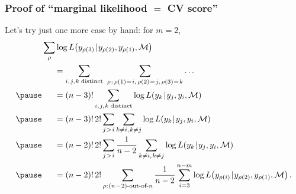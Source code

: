 \documentclass[18pt]{beamer}
\newcommand{\defineTightSpacing}{%
	\setlength{\abovedisplayskip}{.25\baselineskip}%
	\setlength{\belowdisplayskip}{.25\baselineskip}%
}
\newcommand{\given}{\thinnerspace | \thinnerspace}
\newcommand{\spacedColon}{\mkern .5mu : \mkern 1mu}
\newcommand{\spacedEq}{\mkern 1mu = \mkern 1.5mu}
\newcommand{\thinnerspace}{\mskip.5\thinmuskip}
\newcommand{\likelihood}{L}
\newcommand{\modelSymbol}{\mathcal{M}}
\newcommand{\permutation}{\rho}
\newcommand{\trainingSize}{m}
\newcommand{\testSampleIndex}{i}
\begin{document}
\begin{frame}
\frametitle{Proof of ``marginal likelihood $=$ {\large CV} score''}
Let's try just one more case by hand: for $\trainingSize = 2$,  
\begin{equation*} %
\begin{aligned}
&\sum_\permutation \log \likelihood\!\left(y_{\permutation(3)} \given y_{\permutation(2)}, y_{\permutation(1)}, \modelSymbol \right) \\
	&\hspace*{1.5em}= \sum_{\testSampleIndex, \thinnerspace j, \thinnerspace k \mkern 5mu \mathrm{distinct}} \ 
	\sum_{\permutation \thinnerspace : \, \permutation(1) \spacedEq i, \, \permutation(2) \spacedEq j, \, \permutation(3) \spacedEq k} \ldots \\
	\pause
	&\hspace*{1.5em}= (n - 3)! \sum_{\testSampleIndex, \thinnerspace j, \thinnerspace k \mkern 5mu \mathrm{distinct}} \log \likelihood\!\left(y_k \given y_j, y_\testSampleIndex, \modelSymbol \right) \\
	\pause
	&\hspace*{1.5em}= (n - 3)! \, 2! \sum_{j \thinnerspace > \thinnerspace \testSampleIndex} \sum_{k \neq \testSampleIndex, \thinnerspace k \neq j} \log \likelihood\!\left(y_k \given y_j, y_\testSampleIndex, \modelSymbol \right) \\
	\pause
	&\hspace*{1.5em}= (n - 2)! \, 2! \sum_{j \thinnerspace > \thinnerspace \testSampleIndex} 
		\frac{1}{n - 2}\sum_{k \neq \testSampleIndex, \thinnerspace k \neq j} \log \likelihood\!\left(y_k \given y_j, y_\testSampleIndex, \modelSymbol \right) \\
	\pause
	&\hspace*{1.5em}= (n - 2)! \, 2! \sum_{\permutation \spacedColon \text{$(n \!-\! 2)$-out-of-$n$}}
		\frac{1}{n - 2} \sum_{\testSampleIndex = 3}^{n - \trainingSize} \log \likelihood\!\left(y_{\permutation(\testSampleIndex)} \given y_{\permutation(2)}, y_{\permutation(1)}, \modelSymbol \right).
\end{aligned}
\end{equation*}
\end{frame}
\end{document}
